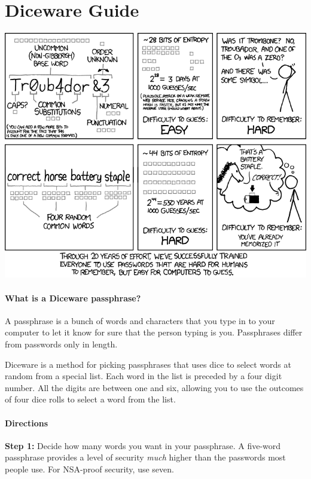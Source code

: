 \chapter*{Diceware Guide}

\includegraphics[width=\textwidth]{password_strength.png}

\newpage
\small
\setlength{\parindent}{0em}
\setlength{\parskip}{0.5em}

\subsubsection*{What is a Diceware passphrase?}

A passphrase is a bunch of words and characters that you type in to your computer to let it know for sure that the person typing is you. Passphrases differ from passwords only in length.

Diceware is a method for picking passphrases that uses dice to select words at random from a special list. Each word in the list is preceded by a four digit number. All the digits are between one and six, allowing you to use the outcomes of four dice rolls to select a word from the list.

\subsubsection*{Directions}

\textbf{Step 1:} Decide how many words you want in your passphrase. A five-word passphrase provides a level of security \textit{much} higher than the passwords most people use. For NSA-proof security, use seven.


